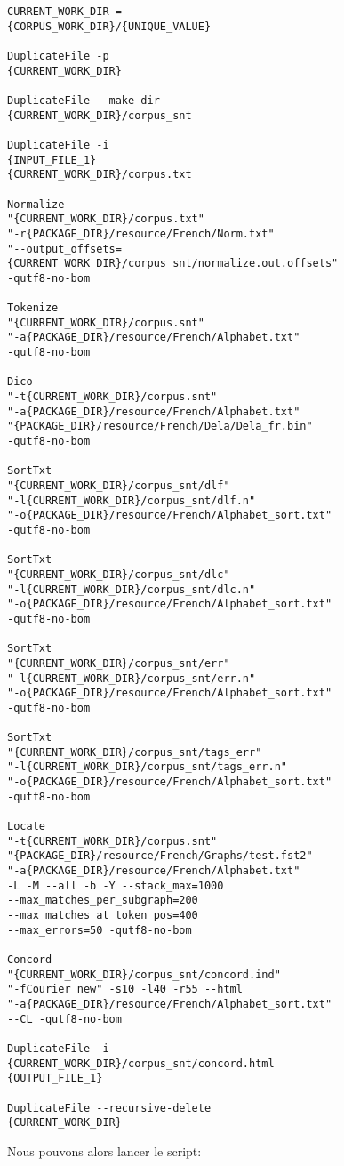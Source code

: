 \begin{verbatim}
CURRENT_WORK_DIR = 
{CORPUS_WORK_DIR}/{UNIQUE_VALUE}

DuplicateFile -p 
{CURRENT_WORK_DIR}

DuplicateFile --make-dir 
{CURRENT_WORK_DIR}/corpus_snt

DuplicateFile -i 
{INPUT_FILE_1} 
{CURRENT_WORK_DIR}/corpus.txt

Normalize 
"{CURRENT_WORK_DIR}/corpus.txt" 
"-r{PACKAGE_DIR}/resource/French/Norm.txt" 
"--output_offsets=
{CURRENT_WORK_DIR}/corpus_snt/normalize.out.offsets" 
-qutf8-no-bom

Tokenize 
"{CURRENT_WORK_DIR}/corpus.snt" 
"-a{PACKAGE_DIR}/resource/French/Alphabet.txt" 
-qutf8-no-bom

Dico 
"-t{CURRENT_WORK_DIR}/corpus.snt" 
"-a{PACKAGE_DIR}/resource/French/Alphabet.txt" 
"{PACKAGE_DIR}/resource/French/Dela/Dela_fr.bin" 
-qutf8-no-bom

SortTxt 
"{CURRENT_WORK_DIR}/corpus_snt/dlf" 
"-l{CURRENT_WORK_DIR}/corpus_snt/dlf.n" 
"-o{PACKAGE_DIR}/resource/French/Alphabet_sort.txt" 
-qutf8-no-bom

SortTxt 
"{CURRENT_WORK_DIR}/corpus_snt/dlc" 
"-l{CURRENT_WORK_DIR}/corpus_snt/dlc.n" 
"-o{PACKAGE_DIR}/resource/French/Alphabet_sort.txt" 
-qutf8-no-bom

SortTxt 
"{CURRENT_WORK_DIR}/corpus_snt/err" 
"-l{CURRENT_WORK_DIR}/corpus_snt/err.n" 
"-o{PACKAGE_DIR}/resource/French/Alphabet_sort.txt" 
-qutf8-no-bom

SortTxt 
"{CURRENT_WORK_DIR}/corpus_snt/tags_err" 
"-l{CURRENT_WORK_DIR}/corpus_snt/tags_err.n" 
"-o{PACKAGE_DIR}/resource/French/Alphabet_sort.txt" 
-qutf8-no-bom

Locate 
"-t{CURRENT_WORK_DIR}/corpus.snt" 
"{PACKAGE_DIR}/resource/French/Graphs/test.fst2" 
"-a{PACKAGE_DIR}/resource/French/Alphabet.txt" 
-L -M --all -b -Y --stack_max=1000 
--max_matches_per_subgraph=200 
--max_matches_at_token_pos=400 
--max_errors=50 -qutf8-no-bom

Concord 
"{CURRENT_WORK_DIR}/corpus_snt/concord.ind" 
"-fCourier new" -s10 -l40 -r55 --html 
"-a{PACKAGE_DIR}/resource/French/Alphabet_sort.txt" 
--CL -qutf8-no-bom

DuplicateFile -i 
{CURRENT_WORK_DIR}/corpus_snt/concord.html 
{OUTPUT_FILE_1}

DuplicateFile --recursive-delete 
{CURRENT_WORK_DIR}
\end{verbatim}

\bigskip
\noindent Nous pouvons alors lancer le script:

